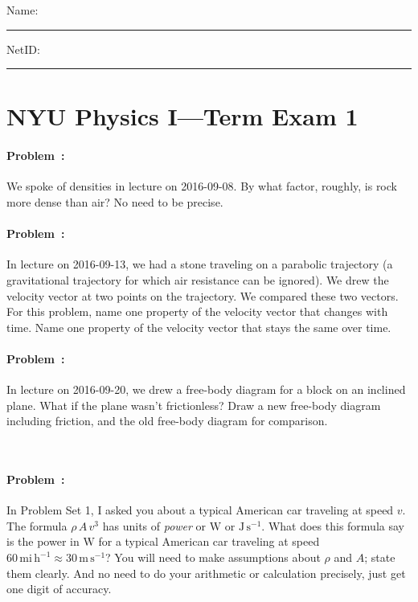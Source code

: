 \documentclass[12pt]{article}
\newcounter{problem}
\newcommand{\m}{\mathrm{m}}
\newcommand{\mi}{\mathrm{mi}}
\newcommand{\s}{\mathrm{s}}
\newcommand{\h}{\mathrm{h}}
\newcommand{\J}{\mathrm{J}}
\newcommand{\W}{\mathrm{W}}
\begin{document}
\sloppy\sloppypar\raggedbottom\frenchspacing\pagestyle{empty}

\noindent
Name: \rule[-1ex]{0.55\textwidth}{0.1pt}
NetID: \rule[-1ex]{0.2\textwidth}{0.1pt}

\section*{NYU Physics I---Term Exam 1}

\paragraph{Problem~\theproblem:}%
We spoke of densities in lecture on 2016-09-08. By what factor,
roughly, is rock more dense than air? No need to be precise.

\vfill

\paragraph{Problem~\theproblem:}%
In lecture on 2016-09-13, we had a stone traveling on a parabolic
trajectory (a gravitational trajectory for which air resistance can be
ignored). We drew the velocity vector at two points on the
trajectory. We compared these two vectors. For this problem, name one
property of the velocity vector that changes with time. Name one
property of the velocity vector that stays the same over time.

\vfill

\paragraph{Problem~\theproblem:}%
In lecture on 2016-09-20, we drew a free-body diagram for a block on
an inclined plane. What if the plane wasn't frictionless? Draw a new
free-body diagram including friction, and the old free-body diagram
for comparison.

\vfill
~

\clearpage
\paragraph{Problem~\theproblem:}%
In Problem Set 1, I asked you about a typical American car traveling
at speed $v$.  The formula $\rho\,A\,v^3$ has units of \emph{power} or
$\W$ or $\J\,\s^{-1}$.  What does this formula say is the power in
$\W$ for a typical American car traveling at speed $60\,\mi\,\h^{-1}\approx
30\,\m\,\s^{-1}$? You will need to make assumptions about $\rho$ and $A$; state them
clearly. And no need to do your arithmetic or calculation precisely, just
get one digit of accuracy.
\end{document}
